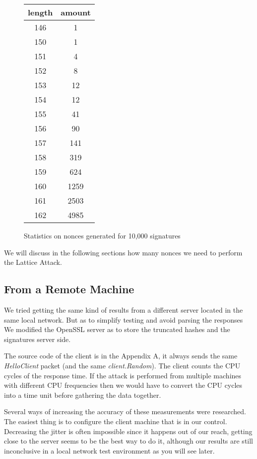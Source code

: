 \documentclass[a4paper,11pt]{article}
\begin{document}
\begin{figure}[H]
\begin{center} 
\begin{tabular}{@{} *2c @{}}
\toprule
length & amount \\ 
\midrule
146 &    1      \\
150&     1       \\
151 &    4       \\
152  &   8       \\
153   &  12      \\
154  &   12      \\
155 &    41      \\
156&     90      \\
157 &    141     \\
158 &    319     \\
159  &   624     \\
160   &  1259    \\
161    & 2503   \\ 
162     &4985    
\bottomrule
\end{tabular}
\end{center} 
\caption{Statistics on nonces generated for 10,000 signatures}
\end{figure}

We will discuss in the following sections how many nonces we need to perform the Lattice Attack.


\subsection{From a Remote Machine}

We tried getting the same kind of results from a different server located in the same local network. But as to simplify testing and avoid parsing the responses We modified the OpenSSL server as to store the truncated hashes and the signatures server side.

The source code of the client is in the Appendix A, it always sends the same \textit{HelloClient} packet (and the same \textit{client.Random}). The client counts the CPU cycles of the response time. If the attack is performed from multiple machines with different CPU frequencies then we would have to convert the CPU cycles into a time unit before gathering the data together.

Several ways of increasing the accuracy of these measurements were researched. The easiest thing is to configure the client machine that is in our control. Decreasing the jitter is often impossible since it happens out of our reach, getting close to the server seems to be the best way to do it, although our results are still inconclusive in a local network test environment as you will see later.
\end{document}

